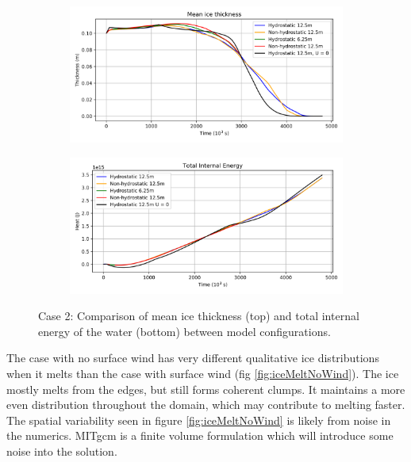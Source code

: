 \documentclass[11pt]{article}
\begin{document}
\clearpage
\begin{figure}[h!]
\begin{subfigure}{0.95\linewidth}
\centering
\includegraphics[width=\linewidth]{iceMelt/icemeltsmooth-deltaIce}
\end{subfigure}
\begin{subfigure}{0.95\linewidth}
\includegraphics[width=\linewidth]{iceMelt/icemeltsmooth-deltaQ}
\end{subfigure}
\caption{Case 2: Comparison of mean ice thickness (top) and total internal energy of the water (bottom) between model configurations.}
\label{fig:iceMeltCompareWinds}
\end{figure}

The case with no surface wind has very different qualitative ice distributions when it melts than the case with surface wind (fig \ref{fig:iceMeltNoWind}). The ice mostly melts from the edges, but still forms coherent clumps. It maintains a more even distribution throughout the domain, which may contribute to melting faster. The spatial variability seen in figure \ref{fig:iceMeltNoWind} is likely from noise in the numerics. MITgcm is a finite volume formulation which will introduce some noise into the solution.
\end{document}
